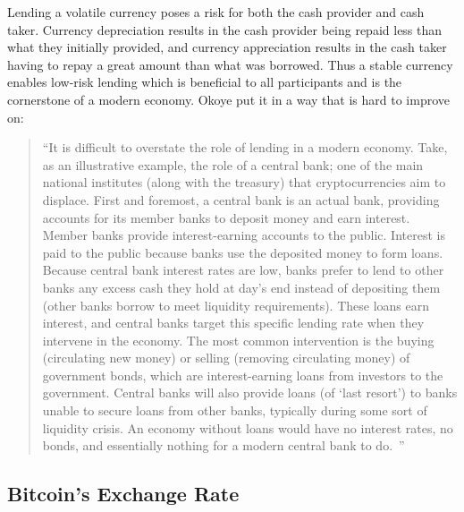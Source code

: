 Lending a volatile currency poses a risk for both the cash provider and cash taker. Currency depreciation results in the cash provider being repaid less than what they initially provided, and currency appreciation results in the cash taker having to repay a great amount than what was borrowed. Thus a stable currency enables low-risk lending which is beneficial to all participants and is the cornerstone of a modern economy. Okoye \etal put it in a way that is hard to improve on:

\begin{quote}

``It is difficult to overstate the role of lending in a modern economy. Take, as an illustrative example, the role of a central bank; one of the main national institutes (along with the treasury) that cryptocurrencies aim to displace. First and foremost, a central bank is an actual bank, providing accounts for its member banks to deposit money and earn interest. Member banks provide interest-earning accounts to the public. Interest is paid to the public because banks use the deposited money to form loans. Because central bank interest rates are low, banks prefer to lend to other banks any excess cash they hold at day's end instead of depositing them (other banks borrow to meet liquidity requirements). These loans earn interest, and central banks target this specific lending rate when they intervene in the economy. The most common intervention is the buying (circulating new money) or selling (removing circulating money) of government bonds, which are interest-earning loans from investors to the government. Central banks will also provide loans (of `last resort') to banks unable to secure loans from other banks, typically during some sort of liquidity crisis. An economy without loans would have no interest rates, no bonds, and essentially nothing for a modern central bank to do.~\cite{okoyetoward}''

\end{quote}


\subsection{Bitcoin's Exchange Rate}


